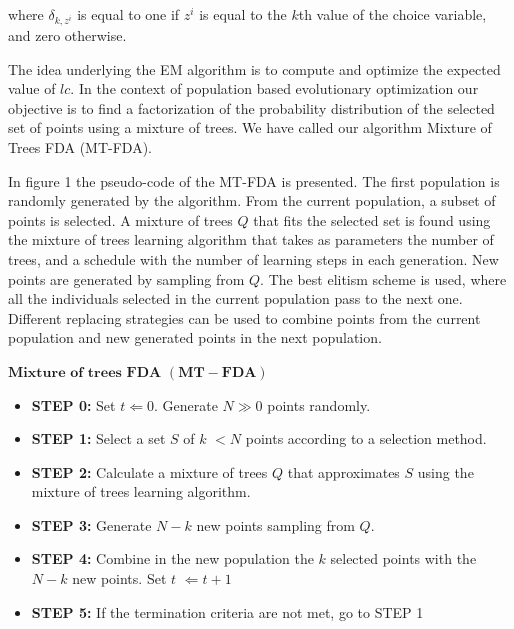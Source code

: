 \documentclass[10pt,thmsa]{article}
\begin{document}
where $\delta _{k,z^i}$ is equal to one if $z^i$ is equal to the $k$th value
of the choice variable, and zero otherwise.

The idea underlying the EM algorithm is to compute and optimize the expected
value of $lc$. In the context of population based evolutionary optimization
our objective is to find a factorization of the probability distribution of
the selected set of points using a mixture of trees. We have called our
algorithm Mixture of Trees FDA (MT-FDA).

In figure 1 the pseudo-code of the MT-FDA is presented. The first population
is randomly generated by the algorithm. From the current population, a
subset of points is selected. A mixture of trees $Q$ that fits the selected
set is found using the mixture of trees learning algorithm that takes as
parameters the number of trees, and a schedule with the number of learning
steps in each generation. New points are generated by sampling from $Q$. The
best elitism scheme is used, where all the individuals selected in the
current population pass to the next one. Different replacing strategies can
be used to combine points from the current population and new generated
points in the next population.

\medskip

\begin{center}
$\mathbf{M}${$\mathbf{ixture}$ $\mathbf{of}$ $\mathbf{trees}$ $\mathbf{FDA}$ 
}$\mathbf{(MT-FDA)}$
\end{center}

\begin{itemize}
\item  \textbf{STEP 0:} Set $t\Leftarrow 0$. Generate $N\gg 0$ points
randomly.

\item  \textbf{STEP 1:} Select a set $S$ of $k$ $<N$ points according to a
selection method.

\item  \textbf{STEP 2: }Calculate a mixture of trees $Q$ that approximates $S
$ using the mixture of trees learning algorithm.

\item  \textbf{STEP 3:} Generate $N-k$ new points sampling from $Q$.

\item  \textbf{STEP 4:} Combine in the new population the $k$ selected
points with the $N-k$ new points. Set $t$ $\Leftarrow t+1$

\item  \textbf{STEP 5:} If the termination criteria are not met, go to STEP 1
\end{itemize}
\end{document}
